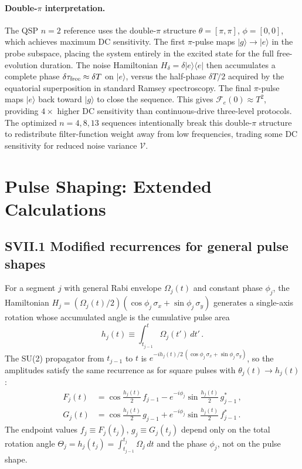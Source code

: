 \documentclass[aps,pra,twocolumn,superscriptaddress,longbibliography]{revtex4-2}
\newcommand{\be}{\begin{equation}}
\newcommand{\ee}{\end{equation}}
\begin{document}
\paragraph{Double-$\pi$ interpretation.}
The QSP $n{=}2$ reference uses the double-$\pi$ structure
$\theta=[\pi,\pi]$, $\phi=[0,0]$, which achieves maximum DC sensitivity.
The first $\pi$-pulse maps $|g\rangle\to|e\rangle$ in the probe subspace,
placing the system entirely in the excited state for the full free-evolution duration.
The noise Hamiltonian $H_\delta = \delta|e\rangle\langle e|$ then accumulates a
complete phase $\delta\tau_{\rm free}\approx\delta T$ on $|e\rangle$,
versus the half-phase $\delta T/2$ acquired by the equatorial superposition in
standard Ramsey spectroscopy.
The final $\pi$-pulse maps $|e\rangle$ back toward $|g\rangle$ to close the sequence.
This gives $\mathcal{F}_e(0)\approx T^2$, providing $4\times$ higher DC
sensitivity than continuous-drive three-level protocols.
The optimized $n{=}4,8,13$ sequences intentionally break this double-$\pi$ structure
to redistribute filter-function weight away from low frequencies,
trading some DC sensitivity for reduced noise variance $\mathcal{V}$.


       \section{Pulse Shaping: Extended Calculations}
       \label{supp:pulseshaping_ext}

       \subsection*{SVII.1 Modified recurrences for general pulse shapes}

       For a segment $j$ with general Rabi envelope $\Omega_j(t)$ and constant phase $\phi_j$,     
       the Hamiltonian $H_j = (\Omega_j(t)/2)(\cos\phi_j\,\sigma_x+\sin\phi_j\,\sigma_y)$
       generates a single-axis rotation whose accumulated angle is the cumulative pulse area       
       \be
         h_j(t) \equiv \int_{t_{j-1}}^{t}\Omega_j(t')\,dt'\,.
       \ee
       The SU(2) propagator from $t_{j-1}$ to $t$ is
       $e^{-ih_j(t)/2\,(\cos\phi_j\,\sigma_x+\sin\phi_j\,\sigma_y)}$,
       so the amplitudes satisfy the same recurrence as for square pulses
       with $\theta_j(t)\to h_j(t)$:
       \begin{align}
         F_j(t) &= \cos\tfrac{h_j(t)}{2}\,f_{j-1} -
       e^{-i\phi_j}\sin\tfrac{h_j(t)}{2}\,g_{j-1}^*\,, \\
         G_j(t) &= \cos\tfrac{h_j(t)}{2}\,g_{j-1} +
       e^{-i\phi_j}\sin\tfrac{h_j(t)}{2}\,f_{j-1}^*\,.
       \end{align}
       The endpoint values $f_j \equiv F_j(t_j)$, $g_j \equiv G_j(t_j)$ depend only on
       the total rotation angle $\Theta_j = h_j(t_j) = \int_{t_{j-1}}^{t_j}\Omega_j\,dt$
       and the phase $\phi_j$, not on the pulse shape.
\end{document}
